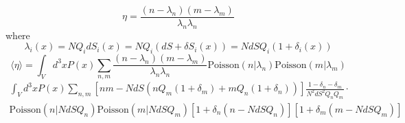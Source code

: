 \documentclass[12pt]{report}
\begin{document}
\begin{equation}
\eta=\frac{(n-\lambda_n)(m-\lambda_m)}{\lambda_n\lambda_n}
\end{equation}
where
\begin{equation}
\lambda_i(x)=NQ_idS_i(x)=NQ_i(dS+\delta S_i(x))=NdSQ_i(1+\delta_i(x))
\end{equation}
\begin{equation}
\langle\eta\rangle=\int_Vd^3xP(x)\sum_{n,m}\frac{(n-\lambda_n)(m-\lambda_m)}{\lambda_n\lambda_n}\text{Poisson}(n|\lambda_n)\text{Poisson}(m|\lambda_m)
\end{equation}
\begin{equation}
\begin{split}
\int_Vd^3xP(x)\sum_{n,m}\left[nm-NdS\left(nQ_m(1+\delta_m)+mQ_n(1+\delta_n)\right)\right]\frac{1-\delta_n-\delta_m}{N^2dS^2Q_nQ_m}\cdot\\
\text{Poisson}(n|NdSQ_n)\text{Poisson}(m|NdSQ_m)\left[1+\delta_n(n-NdSQ_n)\right]\left[1+\delta_m(m-NdSQ_m)\right]
\end{split}
\end{equation}
\begin{equation}
\begin{split}
\end{split}
\end{equation}
\end{document}
